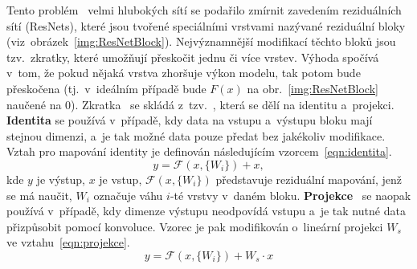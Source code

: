 Tento problém~\cite{website:IntroToResNet, article:DeepResNetForImg} velmi hlubokých sítí se podařilo zmírnit zavedením reziduálních sítí (ResNets), které jsou tvořené speciálními vrstvami nazývané reziduální bloky (viz~obrázek~\ref{img:ResNetBlock}). Nejvýznamnější modifikací těchto bloků jsou tzv.~zkratky, které umožňují přeskočit jednu či více vrstev. Výhoda spočívá v~tom, že pokud nějaká vrstva zhoršuje výkon modelu, tak potom bude přeskočena (tj.~v~ideálním případě bude $F(x)$ na obr.~\ref{img:ResNetBlock} naučené na $0$). Zkratka~\cite{website:QuickOverviewResNet, website:ResNetIntro} se skládá z~tzv.~, která se dělí na identitu a~projekci. \textbf{Identita} se používá v~případě, kdy data na vstupu a~výstupu bloku mají stejnou dimenzi, a~je tak možné data pouze předat bez jakékoliv modifikace. Vztah pro mapování identity je definován následujícím vzorcem~\ref{eqn:identita}.
\newpage
\begin{equation}
    \label{eqn:identita}
    y = \mathcal{F}(x, \{W_i\}) + x,
\end{equation}
kde $y$ je výstup, $x$ je vstup, $\mathcal{F}(x, \{W_i\})$ představuje reziduální mapování, jenž se má naučit, $W_i$ označuje váhu $i$-té vrstvy v~daném bloku. \textbf{Projekce}~\cite{website:QuickOverviewResNet} se naopak používá v~případě, kdy dimenze výstupu neodpovídá vstupu a~je tak nutné data přizpůsobit pomocí konvoluce. Vzorec je pak modifikován o~lineární projekci $W_s$ ve vztahu~\ref{eqn:projekce}.
\begin{equation}
    \label{eqn:projekce}
    y = \mathcal{F}(x, \{W_i\}) + W_s \cdot x
\end{equation}

